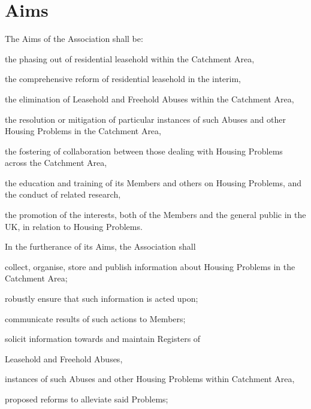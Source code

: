 \documentclass[10pt]{mk-articles-of-association}
\newcommand{\LAFA}[0]{Leasehold and Freehold Abuses}
\begin{document}
\section{Aims}
\begin{constenum}

\item The Aims of the Association shall be:

  \begin{constenum}

  \item the phasing out of residential leasehold within the Catchment Area,

  \item the comprehensive reform of residential leasehold in the interim,

  \item the elimination of \LAFA{} within the Catchment Area,

  \item the resolution or mitigation of particular instances of such
    Abuses and other Housing Problems in the Catchment Area,

  \item the fostering of collaboration between those dealing with
    Housing Problems across the Catchment Area,

  \item the education and training of its Members and others on
    Housing Problems, and the conduct of related research, \ITand

  \item the promotion of the interests, both of the Members and the
    general public in the UK, in relation to Housing Problems.

  \end{constenum}

\item In the furtherance of its Aims, the Association shall
\begin{constenum}

  \item collect, organise, store and publish information about
    Housing Problems in the Catchment Area;

  \item robustly ensure that such information is acted upon;

  \item communicate results of such actions to Members;

  \item solicit information towards and maintain Registers of
    \begin{constenum}
    \item \LAFA, \ITand
    \item instances of such Abuses and other Housing Problems within
      Catchment Area,
    \item proposed reforms to alleviate said Problems;
    \end{constenum}


\end{constenum}
\end{constenum}
\end{document}

